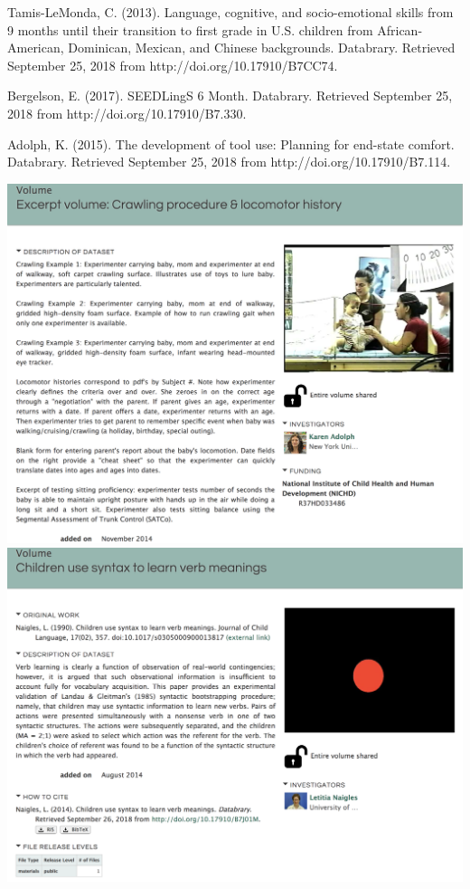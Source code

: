 \documentclass[landscape,final,paperwidth=75in,paperheight=48in,fontscale=0.285]{baposter}
\begin{document}
\begin{poster}
{\begin{multicols}{3} 
    \tiny
    \par Tamis-LeMonda, C. (2013). Language, cognitive, and socio-emotional skills from 9 months until their transition to first grade in U.S. children from African-American, Dominican, Mexican, and Chinese backgrounds. Databrary. Retrieved September 25, 2018 from http://doi.org/10.17910/B7CC74.
    \columnbreak
    \par Bergelson, E. (2017). SEEDLingS 6 Month. Databrary. Retrieved September 25, 2018 from http://doi.org/10.17910/B7.330.
    \columnbreak
    \par Adolph, K. (2015). The development of tool use: Planning for end-state comfort. Databrary. Retrieved September 25, 2018 from http://doi.org/10.17910/B7.114. 
\end{multicols} 
}
{
\begin{center}
    \includegraphics[scale=0.32,valign=t]{img/volume86.png}
    \hfill
    \includegraphics[scale=0.32,valign=t]{img/volume44.png}

\end{center}}
\end{poster}
\end{document}
